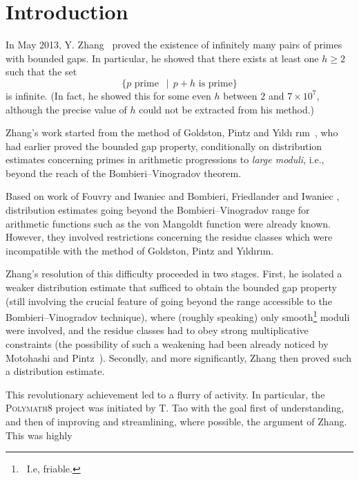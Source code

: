 \documentclass[12pt,a4paper,reqno]{amsart}
\numberwithin{equation}{section}
\theoremstyle{plain}
\theoremstyle{definition}
\begin{document}
\setcounter{tocdepth}{1}
\tableofcontents


\section{Introduction}\label{sec:intro}

In May 2013, Y. Zhang~\cite{zhang} proved the existence of infinitely
many pairs of primes with bounded gaps. In particular, he showed that
there exists at least one $h\geq 2$ such that the set
$$
\{p\text{ prime }\,\mid\, p+h\text{ is prime}\}
$$
is infinite.  (In fact, he showed this for some even $h$ between $2$ and $7 \times 10^7$, although the precise value of $h$ could not be extracted from his method.)
\par
Zhang's work started from the method of Goldston, Pintz and Y\i ld\i
r\i m~\cite{gpy}, who had earlier proved the bounded gap property,
conditionally on distribution estimates concerning primes in
arithmetic progressions to \emph{large moduli}, i.e., beyond the reach
of the Bombieri--Vinogradov theorem.
\par
Based on work of Fouvry and Iwaniec \cite{ft, fi,fi-2,fik-3} and Bombieri, Friedlander and
Iwaniec \cite{bfi,bfi-2,bfi-3}, distribution estimates going beyond the Bombieri--Vinogradov range for arithmetic functions such as the von Mangoldt function were already
known. However, they involved restrictions concerning the residue
classes which were incompatible with the method of Goldston, Pintz and
Y\i ld\i r\i m.
\par
Zhang's resolution of this difficulty proceeded in two stages.  First, he isolated a weaker distribution estimate
that sufficed to obtain the bounded gap property (still involving the
crucial feature of going beyond the range accessible to the
Bombieri--Vinogradov technique), where
(roughly speaking) only smooth\footnote{\ I.e, friable.}  moduli were
involved, and the residue classes had to obey strong multiplicative
constraints (the possibility of such a weakening
had been already noticed by Motohashi and Pintz~\cite{mp}). Secondly, and more significantly, Zhang then proved such a distribution estimate.
\par
This revolutionary achievement led to a flurry of activity. In
particular, the \textsc{Polymath8} project was initiated by T. Tao
with the goal first of understanding, and then of improving and
streamlining, where possible, the argument of Zhang. This was highly
\end{document}
